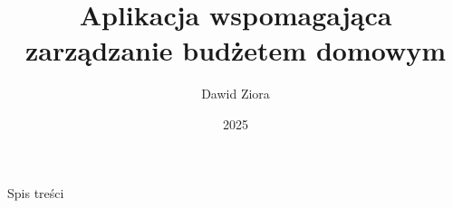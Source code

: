 \documentclass{beamer}
\title{Aplikacja wspomagająca zarządzanie budżetem domowym}
\author{Dawid Ziora}
\date[]{2025}
\begin{document}
\maketitle

\begin{frame}{Spis treści}
	\tableofcontents
\end{frame}




\end{document}
